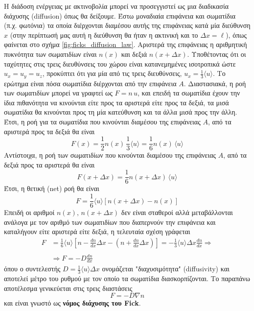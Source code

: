 Η διάδοση ενέργειας με ακτινοβολία μπορεί να προσεγγιστεί ως μια διαδικασία διάχυσης (diffusion) όπως θα δείξουμε. Έστω μοναδιαία επιφάνεια και σωματίδια (π.χ. φωτόνια) τα οποία διέρχονται διαμέσου αυτής της επιφάνειας κατά μία διεύθυνση $x$ (στην περίπτωσή μας αυτή η διεύθυνση θα ήταν η ακτινική και το $\Delta x = \ell$), όπως φαίνεται στο σχήμα \ref{fig:ficks_diffusion_law}. Αριστερά της επιφάνειας η αριθμητική πυκνότητα των σωματιδίων είναι $n(x)$ και δεξιά $n(x+\Delta x)$. Υποθέτοντας ότι οι ταχύτητες στις τρεις διευθύνσεις του χώρου είναι κατανεμημένες ισοτροπικά ώστε $u_x = u_y = u_z$, προκύπτει ότι για μία από τις τρεις διευθύνσεις, $u_x = \frac{1}{3} \langle u \rangle$. Το ερώτημα είναι πόσα σωματίδια διέρχονται από την επιφάνεια $A$. Διαστασιακά, η ροή των σωματιδίων μπορεί να γραφτεί ως $F = n \,u$, και επειδή τα σωματίδια έχουν την ίδια πιθανότητα να κινούνται είτε προς τα αριστερά είτε προς τα δεξιά, τα μισά σωματίδια θα κινούνται προς τη μία κατεύθυνση και τα άλλα μισά προς την άλλη. Έτσι, η ροή για τα σωματίδια που κινούνται διαμέσου της επιφάνειας $A$, από τα αριστερά προς τα δεξιά θα είναι
\begin{equation*}
    F(x) = \frac{1}{2} n(x) \,\frac{1}{3} \langle u \rangle = \frac{1}{6} n(x) \,\langle u \rangle
\end{equation*}
Αντίστοιχα, η ροή των σωματιδίων που κινούνται διαμέσου της επιφάνειας $A$, από τα δεξιά προς τα αριστερά θα είναι
\begin{equation*}
    F(x + \Delta x) = \frac{1}{6} n(x+\Delta x) \,\langle u \rangle
\end{equation*}
Έτσι, η θετική (net) ροή θα είναι
\begin{equation*}
    F = \frac{1}{6} \langle u \rangle \left[ n(x+\Delta x) - n(x) \right]
\end{equation*}
Επειδή οι αριθμοί $n(x), \,n(x + \Delta x)$ δεν είναι σταθεροί αλλά μεταβάλλονται ανάλογα με τον αριθμό των σωματιδίων που διαπερνούν την επιφάνεια και καταλήγουν είτε αριστερά είτε δεξιά, η τελευταία σχέση γράφεται
\begin{align}
    \nonumber F &= \frac{1}{6} \langle u \rangle \left[ n - \frac{dn}{dx}\Delta x - \left( n + \frac{dn}{dx}\Delta x \right) \right] = - \frac{1}{3} \langle u \rangle \Delta x \frac{dn}{dx} \Rightarrow \\ \nonumber \\
    &\Rightarrow F = -D \frac{dn}{dx}
\end{align}
όπου ο συντελεστής $D = \frac{1}{3} \langle u \rangle \Delta x$ ονομάζεται "διαχυσιμότητα" (diffusivity) και αποτελεί μέτρο του ρυθμού με τον οποίο τα σωματίδια διασκορπίζονται. Το παραπάνω αποτέλεσμα γενικεύεται στις τρεις διαστάσεις
\begin{equation}
    \label{eq:ficks_diffusion_law}
    F = - D \nabla n
\end{equation}
και είναι γνωστό ως \textbf{νόμος διάχυσης του Fick}.

